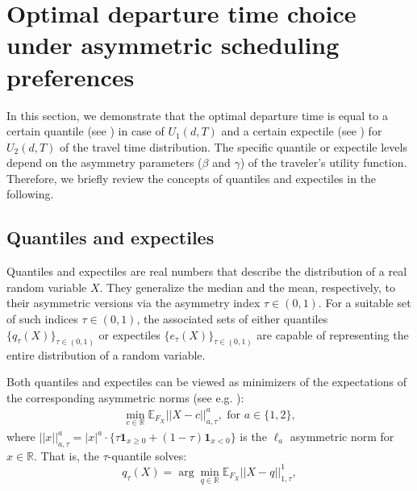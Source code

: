 \documentclass[preprint, 3p, authoryear]{elsarticle} %
\theoremstyle{definition}
\theoremstyle{definition}
\theoremstyle{definition}
\theoremstyle{definition}
\theoremstyle{remark}
\begin{document}
\hypertarget{optimal-departure-time-choice-under-asymmetric-scheduling-preferences}{%
\section{Optimal departure time choice under asymmetric scheduling preferences}\label{optimal-departure-time-choice-under-asymmetric-scheduling-preferences}}

In this section, we demonstrate that the optimal departure time is equal to a certain quantile (see \citet{koenker1978}) in case of \(U_1(d,T)\) and a certain expectile (see \citet{newey1987}) for \(U_2(d,T)\) of the travel time distribution. The specific quantile or expectile levels depend on the asymmetry parameters (\(\beta\) and \(\gamma\)) of the traveler's utility function. Therefore, we briefly review the concepts of quantiles and expectiles in the following.

\hypertarget{quantiles-and-expectiles}{%
\subsection{Quantiles and expectiles}\label{quantiles-and-expectiles}}

Quantiles and expectiles are real numbers that describe the distribution of a real random variable \(X\). They generalize the median and the mean, respectively, to their asymmetric versions via the asymmetry index \(\tau\in(0,1)\). For a suitable set of such indices \(\tau\in(0,1)\), the associated sets of either quantiles \(\{q_\tau(X)\}_{\tau\in(0,1)}\) or expectiles \(\{e_\tau(X)\}_{\tau\in(0,1)}\) are capable of representing the entire distribution of a random variable.

Both quantiles and expectiles can be viewed as minimizers of the expectations of the corresponding asymmetric norms (see e.g. \citet{tran2019}):
\begin{align}
\min_{c\in\mathbb R}\mathbb E_{F_X}||X-c||^a_{a,\tau}, \text{ for } a\in\{1,2\}, \label{eq:asnorm}
\end{align}
where \(||x||^a_{a,\tau}=|x|^a\cdot\{\tau\mathbf 1_{x\geq 0}+(1-\tau)\mathbf 1_{x<0}\}\) is the \(\ell_a\) asymmetric norm for \(x\in\mathbb R\).
That is, the \(\tau\)-quantile solves:
\begin{equation}q_\tau(X) = \arg\min_{q\in\mathbb R}\mathbb E_{F_X}||X-q||^1_{1,\tau},\label{eq:quantile}
\end{equation}
\end{document}

